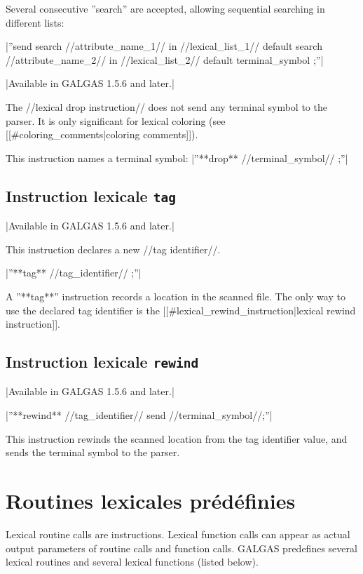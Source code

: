 Several consecutive ''search'' are accepted, allowing sequential searching in different lists:

|''send search //attribute\_name\_1// in //lexical\_list\_1// default search //attribute\_name\_2// in //lexical\_list\_2// default terminal\_symbol ;''|


|Available in GALGAS 1.5.6 and later.|


The //lexical drop instruction// does not send any terminal symbol to the parser. It is only significant for lexical coloring (see [[\#coloring\_comments|coloring comments]]).

This instruction names a terminal symbol:
|''**drop** //terminal\_symbol// ;''|


\subsection{Instruction lexicale \texttt{tag}}

|Available in GALGAS 1.5.6 and later.|

This instruction declares a new //tag identifier//.

|''**tag** //tag\_identifier// ;''|

A ''**tag**'' instruction records a location in the scanned file. The only way to use the declared tag identifier is the [[\#lexical\_rewind\_instruction|lexical rewind instruction]].

\subsection{Instruction lexicale \texttt{rewind}}

|Available in GALGAS 1.5.6 and later.|

|''**rewind** //tag\_identifier// send //terminal\_symbol//;''|

This instruction rewinds the scanned location from the tag identifier value, and sends the terminal symbol to the parser.








\section{Routines lexicales prédéfinies}

Lexical routine calls are instructions. Lexical function calls can appear as actual output parameters of routine calls and function calls. GALGAS predefines several lexical routines and several lexical functions (listed below).

